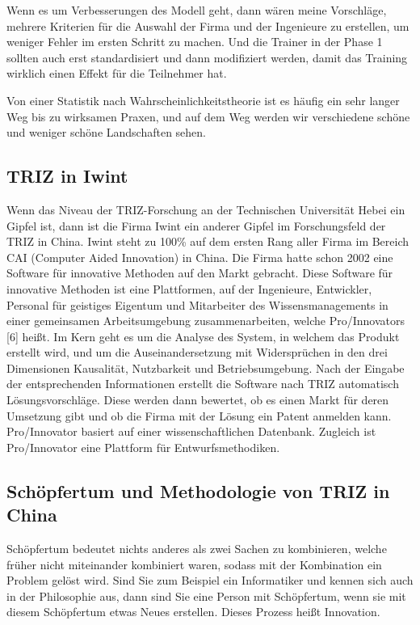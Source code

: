 \documentclass[11pt,a4paper]{article}
\begin{document}
Wenn es um Verbesserungen des Modell geht, dann wären meine Vorschläge,
mehrere Kriterien für die Auswahl der Firma und der Ingenieure zu erstellen,
um weniger Fehler im ersten Schritt zu machen. Und die Trainer in der Phase 1
sollten auch erst standardisiert und dann modifiziert werden, damit das
Training wirklich einen Effekt für die Teilnehmer hat.

Von einer Statistik nach Wahrscheinlichkeitstheorie ist es häufig ein sehr
langer Weg bis zu wirksamen Praxen, und auf dem Weg werden wir verschiedene
schöne und weniger schöne Landschaften sehen.

\subsection{TRIZ in Iwint}
Wenn das Niveau der TRIZ-Forschung an der Technischen Universität Hebei ein
Gipfel ist, dann ist die Firma Iwint ein anderer Gipfel im Forschungsfeld der
TRIZ in China. Iwint steht zu 100\% auf dem ersten Rang aller Firma im Bereich
CAI (Computer Aided Innovation) in China.  Die Firma hatte schon 2002 eine
Software für innovative Methoden auf den Markt gebracht. Diese Software für
innovative Methoden ist eine Plattformen, auf der Ingenieure, Entwickler,
Personal für geistiges Eigentum und Mitarbeiter des Wissensmanagements in
einer gemeinsamen Arbeitsumgebung zusammenarbeiten, welche Pro/Innovators [6]
heißt.  Im Kern geht es um die Analyse des System, in welchem das Produkt
erstellt wird, und um die Auseinandersetzung mit Widersprüchen in den drei
Dimensionen Kausalität, Nutzbarkeit und Betriebsumgebung.  Nach der Eingabe
der entsprechenden Informationen erstellt die Software nach TRIZ automatisch
Lösungsvorschläge. Diese werden dann bewertet, ob es einen Markt für deren
Umsetzung gibt und ob die Firma mit der Lösung ein Patent anmelden kann.
Pro/Innovator basiert auf einer wissenschaftlichen Datenbank. Zugleich ist
Pro/Innovator eine Plattform für Entwurfsmethodiken.

\subsection{Schöpfertum und Methodologie von TRIZ in China}
Schöpfertum bedeutet nichts anderes als zwei Sachen zu kombinieren, welche
früher nicht miteinander kombiniert waren, sodass mit der Kombination ein
Problem gelöst wird. Sind Sie zum Beispiel ein Informatiker und kennen sich
auch in der Philosophie aus, dann sind Sie eine Person mit Schöpfertum, wenn
sie mit diesem Schöpfertum etwas Neues erstellen. Dieses Prozess heißt
Innovation.
\end{document}
